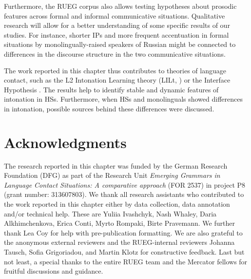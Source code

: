 \documentclass[output=paper,colorlinks,citecolor=brown]{langscibook}
\begin{document}
Furthermore, the RUEG corpus also allows testing hypotheses about prosodic features across formal and informal communicative situations. Qualitative research will allow for a better understanding of some specific results of our studies. For instance, shorter IPs and more frequent accentuation in formal situations by monolingually-raised speakers of Russian might be connected to differences in the discourse structure in the two communicative situations.

The work reported in this chapter thus contributes to theories of language contact, such as the L2 Intonation Learning theory (LILt, \cite{Mennen_2015}) or the Interface Hypothesis \citep{Sorace_2011}. The results help to identify stable and dynamic features of intonation in HSs. Furthermore, when HSs and monolinguals showed differences in intonation, possible sources behind these differences were discussed.


\section*{Acknowledgments}
The research reported in this chapter was funded by the German Research Foundation (DFG) as part of the Research Unit \textit{Emerging Grammars in Language Contact Situations: A comparative approach} (FOR 2537) in project P8 (grant number: 313607803). We thank all research assistants who contributed to the work reported in this chapter either by data collection, data annotation and/or technical help. These are Yuliia Ivashchyk, Nash Whaley, Daria Alkhimchenkova, Erica Conti, Myrto Rompaki, Birte Pravemann. We further thank Lea Coy for help with pre-publication formatting. We are also grateful to the anonymous external reviewers and the RUEG-internal reviewers Johanna Tausch, Sofia Grigoriadou, and Martin Klotz for constructive feedback. Last but not least, a special thanks to the entire RUEG team and the Mercator fellows for fruitful discussions and guidance.


\printbibliography[heading=subbibliography, notkeyword=this]
\end{document}
